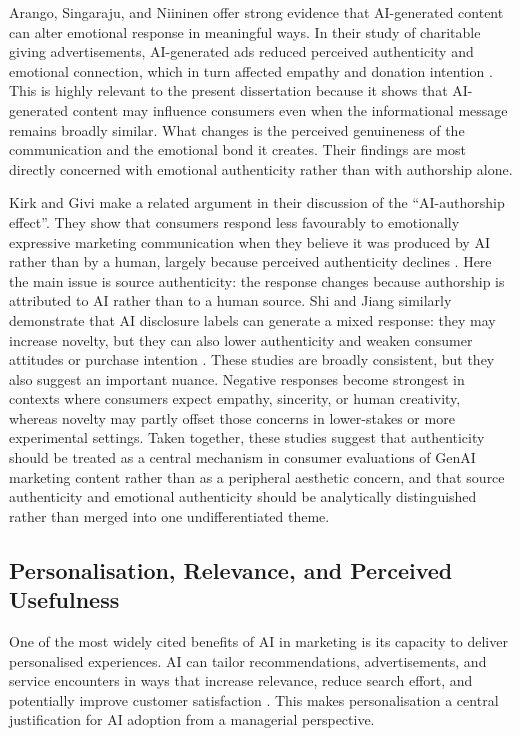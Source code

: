 Arango, Singaraju, and Niininen offer strong evidence that AI-generated content can alter emotional response in meaningful ways. In their study of charitable giving advertisements, AI-generated ads reduced perceived authenticity and emotional connection, which in turn affected empathy and donation intention \cite{arango2023charitable}. This is highly relevant to the present dissertation because it shows that AI-generated content may influence consumers even when the informational message remains broadly similar. What changes is the perceived genuineness of the communication and the emotional bond it creates. Their findings are most directly concerned with emotional authenticity rather than with authorship alone.

Kirk and Givi make a related argument in their discussion of the ``AI-authorship effect''. They show that consumers respond less favourably to emotionally expressive marketing communication when they believe it was produced by AI rather than by a human, largely because perceived authenticity declines \cite{kirk2025aiauthorship}. Here the main issue is source authenticity: the response changes because authorship is attributed to AI rather than to a human source. Shi and Jiang similarly demonstrate that AI disclosure labels can generate a mixed response: they may increase novelty, but they can also lower authenticity and weaken consumer attitudes or purchase intention \cite{shi2026disclosure}. These studies are broadly consistent, but they also suggest an important nuance. Negative responses become strongest in contexts where consumers expect empathy, sincerity, or human creativity, whereas novelty may partly offset those concerns in lower-stakes or more experimental settings. Taken together, these studies suggest that authenticity should be treated as a central mechanism in consumer evaluations of GenAI marketing content rather than as a peripheral aesthetic concern, and that source authenticity and emotional authenticity should be analytically distinguished rather than merged into one undifferentiated theme.

\subsection{Personalisation, Relevance, and Perceived Usefulness}
One of the most widely cited benefits of AI in marketing is its capacity to deliver personalised experiences. AI can tailor recommendations, advertisements, and service encounters in ways that increase relevance, reduce search effort, and potentially improve customer satisfaction \cite{haleem2022ai,kumar2024aipowered}. This makes personalisation a central justification for AI adoption from a managerial perspective.

